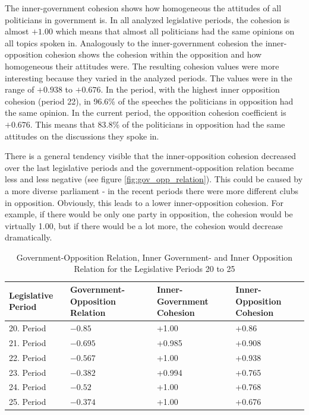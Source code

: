 The inner-government cohesion shows how homogeneous the attitudes of all politicians in government is. In all analyzed legislative periods, the cohesion is almost $+1.00$ which means that almost all politicians had the same opinions on all topics spoken in. Analogously to the inner-government cohesion the inner-opposition cohesion shows the cohesion within the opposition and how homogeneous their attitudes were. The resulting cohesion values were more interesting because they varied in the analyzed periods. The values were in the range of $+0.938$ to $+0.676$. In the period, with the highest inner opposition cohesion (period 22), in 96.6\% of the speeches the politicians in opposition had the same opinion. In the current period, the opposition cohesion coefficient is $+0.676$. This means that 83.8\% of the politicians in opposition had the same attitudes on the discussions they spoke in.

There is a general tendency visible that the inner-opposition cohesion decreased over the last legislative periods and the government-opposition relation became less and less negative (see figure \ref{fig:gov_opp_relation}). This could be caused by a more diverse parliament - in the recent periods there were more different clubs in opposition. Obviously, this leads to a lower inner-opposition cohesion. For example, if there would be only one party in opposition, the cohesion would be virtually 1.00, but if there would be a lot more, the cohesion would decrease dramatically.

\begin{table}

\centering
\bgroup
\def\arraystretch{1.2}
\begin{tabular}{| p{2cm} | p{3cm} | p{3cm} | p{3cm} |}
\hline
  Legislative Period & Government-Opposition Relation & Inner-Government Cohesion & Inner-Opposition Cohesion \\
\hline
\hline
  20. Period & $-0.85$ & +1.00 & +0.86 \\
\hline
  21. Period & $-0.695$ & +0.985 & +0.908 \\
\hline
  22. Period & $-0.567$ & +1.00 & +0.938 \\
\hline
  23. Period & $-0.382$ & +0.994 & +0.765\\
\hline
  24. Period & $-0.52$ & +1.00 & +0.768\\
\hline
  25. Period & $-0.374$ & +1.00 & +0.676\\
\hline

\end{tabular}
\egroup
\caption{Government-Opposition Relation, Inner Government- and Inner Opposition Relation for the Legislative Periods 20 to 25}
\label{table:gov_opp_relation}
\end{table}

